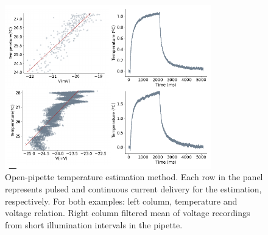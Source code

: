 \begin{figure}[htb!]
	\centering
	\includegraphics[width=0.8\textwidth]{img/laser/temperature_estimation.pdf}
	\caption{Open-pipette temperature estimation method. Each row in the panel represents pulsed and continuous current delivery for the estimation, respectively. For both examples: left column, temperature and voltage relation. Right column filtered mean of voltage recordings from short illumination intervals in the pipette. }
	\label{fig:temperature estimation}
\end{figure}
